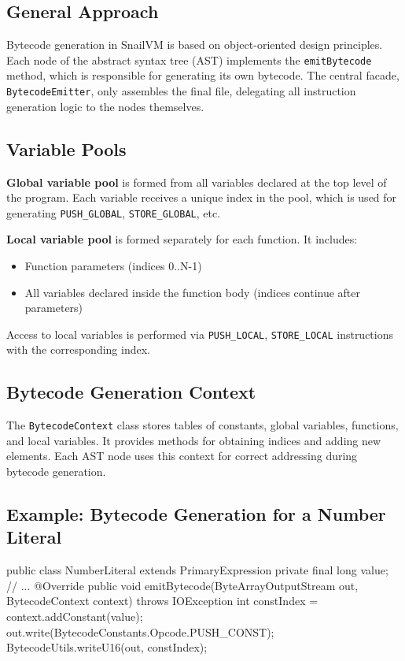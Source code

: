\documentclass[a4paper,12pt]{article}
\begin{document}
    \subsection{General Approach}
    Bytecode generation in SnailVM is based on object-oriented design principles. Each node of the abstract syntax tree (AST) implements the \texttt{emitBytecode} method, which is responsible for generating its own bytecode. The central facade, \texttt{BytecodeEmitter}, only assembles the final file, delegating all instruction generation logic to the nodes themselves.

    \subsection{Variable Pools}
    \textbf{Global variable pool} is formed from all variables declared at the top level of the program. Each variable receives a unique index in the pool, which is used for generating \texttt{PUSH\_GLOBAL}, \texttt{STORE\_GLOBAL}, etc.

    \textbf{Local variable pool} is formed separately for each function. It includes:
    \begin{itemize}
      \item Function parameters (indices 0..N-1)
      \item All variables declared inside the function body (indices continue after parameters)
    \end{itemize}
    Access to local variables is performed via \texttt{PUSH\_LOCAL}, \texttt{STORE\_LOCAL} instructions with the corresponding index.

    \subsection{Bytecode Generation Context}
    The \texttt{BytecodeContext} class stores tables of constants, global variables, functions, and local variables. It provides methods for obtaining indices and adding new elements. Each AST node uses this context for correct addressing during bytecode generation.

    \subsection{Example: Bytecode Generation for a Number Literal}
    \begin{snailcode}
    public class NumberLiteral extends PrimaryExpression {
        private final long value;
        // ...
        @Override
        public void emitBytecode(ByteArrayOutputStream out, BytecodeContext context) throws IOException {
            int constIndex = context.addConstant(value);
            out.write(BytecodeConstants.Opcode.PUSH_CONST);
            BytecodeUtils.writeU16(out, constIndex);
        }
    }
    \end{snailcode}
\end{document}
